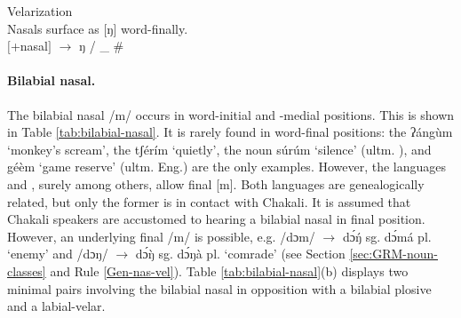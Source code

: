 \begin{Rule}\label{Gen-nas-vel}{Velarization}\\
Nasals surface as [{ŋ}] word-finally.\\
$[${\sc +nasal}$]$  $\rightarrow$   {ŋ}  / \_ \#
\end{Rule}

% 
% 



\paragraph{Bilabial nasal.}
\label{sec:PHON-bil-nas}

The bilabial nasal /{m}/ occurs in word-initial and -medial positions. 
This is shown in Table \ref{tab:bilabial-nasal}. It is rarely  found in  word-final 
positions: the  {\sls ʔángùm} `monkey's scream', the  {\sls  
tʃérím} `quietly',   the noun {\sls súrúm} `silence' (ultm. ), and  
{\sls géèm} `game reserve' (ultm. Eng.) are the only examples.  However, the languages 
 and , surely among others,  allow final [{m}]. Both languages 
are genealogically related,  but only the former is in contact with Chakali. It is 
assumed that Chakali speakers  are accustomed to hearing   a bilabial nasal  in 
final position. However, an underlying final /{m}/ is possible, e.g. /dɔm/ 
$\rightarrow$ {\sls dɔ́ŋ́} {\sc sg.} {\sls dɔ́má}  {\sc pl.} `enemy' and /dɔŋ/ 
$\rightarrow$ {\sls dɔ́ŋ̀} {\sc sg.} {\sls dɔ́ŋà}  {\sc pl.}   `comrade'  (see 
Section \ref{sec:GRM-noun-classes} and Rule \ref{Gen-nas-vel}). Table \ref{tab:bilabial-nasal}(b) displays two 
minimal pairs involving the bilabial nasal in opposition with a bilabial plosive 
and  a labial-velar.
 

